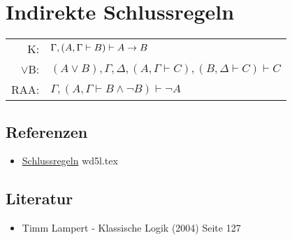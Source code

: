 \documentclass{sajzk}
\begin{document}
\section{Indirekte Schlussregeln}
\label{t3a1}

\begin{center}
    \begin{tabular}{rl}
        K:       & $\Gamma, (A, \Gamma \vdash B) \vdash A \rightarrow B$ \\
        $\lor$B: & $(A\lor B), \Gamma, \Delta, (A, \Gamma \vdash C), (B, \Delta \vdash C) \vdash C$ \\
        RAA:     & $\Gamma, (A, \Gamma \vdash B\land\lnot B)\vdash \lnot A$
    \end{tabular}
\end{center}

\subsection{Referenzen}
\begin{itemize}
    \item \href{wd5l.pdf}{Schlussregeln} wd5l.tex
\end{itemize}

\subsection{Literatur}
\begin{itemize}
    \item Timm Lampert - Klassische Logik (2004) Seite 127
\end{itemize}
\end{document}
